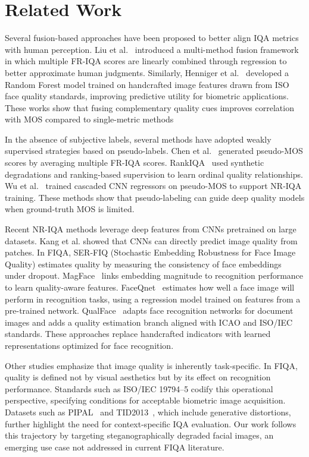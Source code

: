 \section{Related Work}

Several fusion-based approaches have been proposed to better align IQA metrics with human perception. Liu et al.~\cite{liu2013mmf} introduced a multi-method fusion framework in which multiple FR-IQA scores are linearly combined through regression to better approximate human judgments. Similarly, Henniger et al.~\cite{henniger2020biosig} developed a Random Forest model trained on handcrafted image features drawn from ISO face quality standards, improving predictive utility for biometric applications. These works show that fusing complementary quality cues improves correlation with MOS compared to single-metric methods

In the absence of subjective labels, several methods have adopted weakly supervised strategies based on pseudo-labels. Chen et al.~\cite{chen2021pseudo} generated pseudo-MOS scores by averaging multiple FR-IQA scores. RankIQA~\cite{liu2017rankiqa} used synthetic degradations and ranking-based supervision to learn ordinal quality relationships. Wu et al.~\cite{wu2020cnn} trained cascaded CNN regressors on pseudo-MOS to support NR-IQA training. These methods show that pseudo-labeling can guide deep quality models when ground-truth MOS is limited.

Recent NR-IQA methods leverage deep features from CNNs pretrained on large datasets. Kang et al.\cite{kang2014cnn} showed that CNNs can directly predict image quality from patches. In FIQA, SER-FIQ\cite{terhorst2020serfiq} (Stochastic Embedding Robustness for Face Image Quality) estimates quality by measuring the consistency of face embeddings under dropout. MagFace~\cite{meng2021magface} links embedding magnitude to recognition performance to learn quality-aware features. FaceQnet~\cite{hernandez2019faceqnet} estimates how well a face image will perform in recognition tasks, using a regression model trained on features from a pre-trained network. QualFace~\cite{tremoco2021qualface} adapts face recognition networks for document images and adds a quality estimation branch aligned with ICAO and ISO/IEC standards. These approaches replace handcrafted indicators with learned representations optimized for face recognition.

Other studies emphasize that image quality is inherently task-specific. In FIQA, quality is defined not by visual aesthetics but by its effect on recognition performance. Standards such as ISO/IEC 19794--5 codify this operational perspective, specifying conditions for acceptable biometric image acquisition. Datasets such as PIPAL~\cite{pipal} and TID2013~\cite{tid2013}, which include generative distortions, further highlight the need for context-specific IQA evaluation. Our work follows this trajectory by targeting steganographically degraded facial images, an emerging use case not addressed in current FIQA literature.
